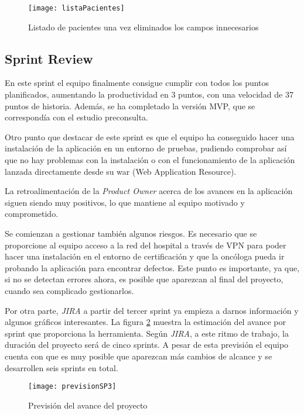 \begin{figure}[!h]
\begin{center}
\texttt{[image: listaPacientes]}
\caption{Listado de pacientes una vez eliminados los campos innecesarios}
\label{fig:listaPacientes}
\end{center}
\end{figure}
\subsection{Sprint Review}
\label{subsec:S3-SR}

En este sprint el equipo finalmente consigue cumplir con todos los puntos planificados, aumentando la productividad en 3 puntos, con una velocidad de 37 puntos de historia. Además, se ha completado la versión MVP, que se correspondía con el estudio preconsulta. 

Otro punto que destacar de este sprint es que el equipo ha conseguido hacer una instalación de la aplicación en un entorno de pruebas, pudiendo comprobar así que no hay problemas con la instalación o con el funcionamiento de la aplicación lanzada directamente desde su war (Web Application Resource).

La retroalimentación de la \emph{Product Owner} acerca de los avances en la aplicación siguen siendo muy positivos, lo que mantiene al equipo motivado y comprometido.

Se comienzan a gestionar también algunos riesgos. Es necesario que se proporcione al equipo acceso a la red del hospital a través de VPN para poder hacer una instalación en el entorno de certificación y que la oncóloga pueda ir probando la aplicación para encontrar defectos. Este punto es importante, ya que, si no se detectan errores ahora, es posible que aparezcan al final del proyecto, cuando sea complicado gestionarlos.

Por otra parte, \emph{JIRA} a partir del tercer sprint ya empieza a darnos información y algunos gráficos interesantes. La figura \ref{fig:predivisiónSP3} muestra la estimación del avance por sprint que proporciona la herramienta. Según \emph{JIRA}, a este ritmo de trabajo, la duración del proyecto será de cinco sprints. A pesar de esta previsión el equipo cuenta con que es muy posible que aparezcan más cambios de alcance y se desarrollen seis sprints en total.

\begin{figure}[!h]
\begin{center}
\texttt{[image: previsionSP3]}
\caption{Previsión del avance del proyecto}
\label{fig:predivisiónSP3}
\end{center}
\end{figure}

